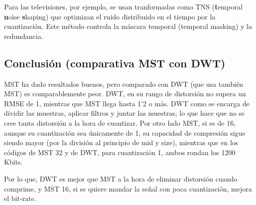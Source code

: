 \documentclass[11pt]{article}
\begin{document}
Para las televisiones, por ejemplo, se usan tranformadas como TNS
(\textbf{t}emporal \textbf{n}oise \textbf{s}haping) que optimizan el
ruido distribuido en el tiempo por la cuantización. Este método controla
la máscara temporal (temporal masking) y la redundancia.

    \subsection{Conclusión (comparativa MST con
DWT)}\label{conclusiuxf3n-comparativa-mst-con-dwt}

    MST ha dado resultados buenos, pero comparado con DWT (que usa también
MST) es comparablemente peor. DWT, en su rango de distorsión no supera
un RMSE de 1, mientras que MST llega hasta 1'2 o más. DWT como se
encarga de dividir las muestras, aplicar filtros y juntar las muestras,
lo que hace que no se cree tanta distorsión a la hora de cuantizar. Por
otro lado MST, si es de 16, aunque su cuantización sea únicamente de 1,
su capacidad de compresión sigue siendo mayor (por la división al
principio de mid y size), mientras que en los códigos de MST 32 y de
DWT, para cuantización 1, ambos rondan los 1200 Kbits.

Por lo que, DWT es mejor que MST a la hora de eliminar distorsión cuando
comprime, y MST 16, si se quiere mandar la señal con poca cuantización,
mejora el bit-rate.


    
    
    
\end{document}

